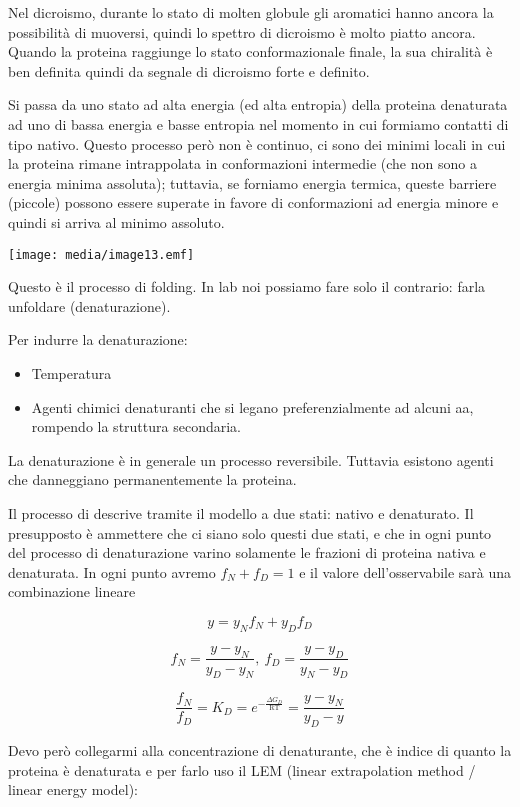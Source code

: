 Nel dicroismo, durante lo stato di molten globule gli aromatici hanno
ancora la possibilità di muoversi, quindi lo spettro di dicroismo è
molto piatto ancora. Quando la proteina raggiunge lo stato
conformazionale finale, la sua chiralità è ben definita quindi da
segnale di dicroismo forte e definito.

Si passa da uno stato ad alta energia (ed alta entropia) della proteina
denaturata ad uno di bassa energia e basse entropia nel momento in cui
formiamo contatti di tipo nativo. Questo processo però non è continuo,
ci sono dei minimi locali in cui la proteina rimane intrappolata in
conformazioni intermedie (che non sono a energia minima assoluta);
tuttavia, se forniamo energia termica, queste barriere (piccole) possono
essere superate in favore di conformazioni ad energia minore e quindi si
arriva al minimo assoluto.

\texttt{[image: media/image13.emf]}

Questo è il processo di folding. In lab noi possiamo fare solo il
contrario: farla unfoldare (denaturazione).

Per indurre la denaturazione:

\begin{itemize}
\item
  Temperatura
\item
  Agenti chimici denaturanti che si legano preferenzialmente ad alcuni
  aa, rompendo la struttura secondaria.
\end{itemize}

La denaturazione è in generale un processo reversibile. Tuttavia
esistono agenti che danneggiano permanentemente la proteina.

Il processo di descrive tramite il modello a due stati: nativo e
denaturato. Il presupposto è ammettere che ci siano solo questi due
stati, e che in ogni punto del processo di denaturazione varino
solamente le frazioni di proteina nativa e denaturata. In ogni punto
avremo \(f_{N} + f_{D} = 1\) e il valore dell'osservabile sarà una
combinazione lineare

\[y = y_{N}f_{N} + y_{D}f_{D}\]

\[f_{N} = \frac{y - y_{N}}{y_{D} - y_{N}},\ f_{D} = \frac{y - y_{D}}{y_{N} - y_{D}}\]

\[\frac{f_{N}}{f_{D}} = K_{D} = e^{- \frac{\Delta G_{D}}{\text{RT}}} = \frac{y - y_{N}}{y_{D} - y}\]

Devo però collegarmi alla concentrazione di denaturante, che è indice di
quanto la proteina è denaturata e per farlo uso il LEM (linear
extrapolation method / linear energy model):

